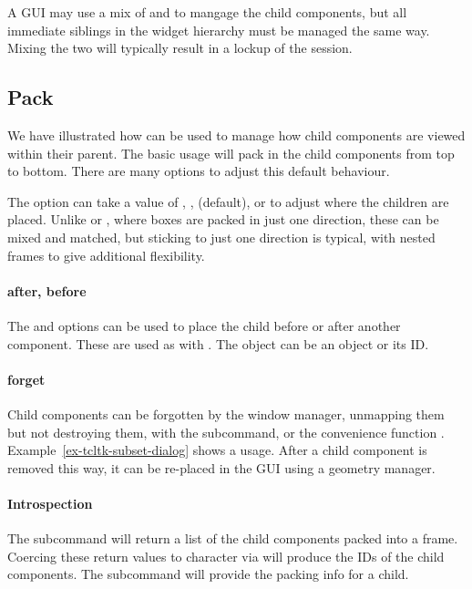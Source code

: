 A GUI may use a mix of  and  to mangage the child components,
but all immediate siblings in the widget hierarchy must be managed the same
way. Mixing the two will typically result in a lockup of the \R\/
session.


\subsection{Pack}
\label{sec:tcltk:pack}


We have illustrated how  can be used to manage how
child components are viewed within their parent. The basic usage
 will pack in the child components from top to
bottom. There are many options to adjust this default behaviour.

The  option can take a value of ,
,  (default), or  to adjust
where the children are placed.  Unlike \GTK{} or \Qt, where boxes are
packed in just one direction, these can be mixed and matched, but
sticking to just one direction is typical, with nested frames to give
additional flexibility.

\paragraph{after, before}
The  and  options can be
used to place the child before or after another component. These are
used as with . The object
 can be an \R\/ object or its ID. 


\paragraph{forget}
Child components can be forgotten by the window manager, unmapping
them but not destroying them, with the 
subcommand, or the convenience function .
Example~\ref{ex-tcltk-subset-dialog} shows a usage.  After a child
component is removed this way, it can be re-placed in the GUI using a
geometry manager.

\paragraph{Introspection}
The subcommand  will return a list of the
child components packed into a frame. Coercing these return values to
character via  will produce the IDs of the child
components. The subcommand  will provide the
packing info for a child.
\\

